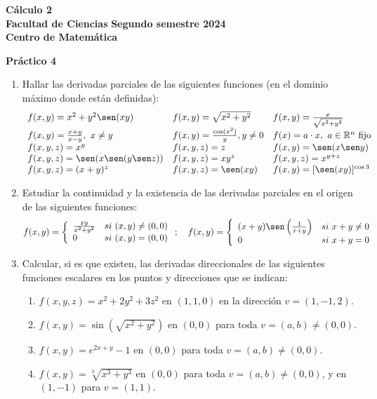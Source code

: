 \documentclass[11pt]{article}
\newcommand{\R}{\mathbb{R}}
\begin{document}
 \hfill {\bf C\'{a}lculo 2} \\
{\bf Facultad de Ciencias} \hfill {\bf Segundo semestre 2024} \\
{\bf Centro de Matem\'{a}tica} 

\vspace{1cm}

\begin{center}
{\bf Pr\'{a}ctico 4 }
\end{center}

\vspace{0,1cm}

\begin{enumerate}

 \item Hallar las derivadas parciales de las siguientes funciones (en el dominio m\'aximo donde est\'an definidas):
   \[\begin{array}{llll}
    f(x,y)=x^2+y^2\sen(xy)&f(x,y)=\sqrt{x^2+y^2}
                                   &f(x,y)=\frac{x}{\sqrt{x^2+y^2}}\\   
    f(x,y)=\frac{x+y}{x-y},\ x\neq y&f(x,y)=\frac{\cos(x^2)}{y},
                           y\neq 0&f(x)=a\cdot x,\ a\in\R^n\textrm{
                             fijo} \\ 
    f(x,y,z)=x^y    &f(x,y,z)=z   &f(x,y)=\sen(x\sen y)\\ 
    f(x,y,z)=\sen(x\sen(y\sen z))&f(x,y,z)=x{y^z}&f(x,y,z)=x^{y+z}\\
    f(x,y,z)=(x+y)^z    &f(x,y,z)=\sen(xy)&f(x,y)=[\sen(xy)]^{\cos
      3}\\ 
    \end{array}\]
    
\item Estudiar la continuidad y la existencia de las derivadas
  parciales en el origen de las siguientes funciones:
\[ f(x,y)= \left\{ \begin{array}{ll}
 \frac{xy}{x^2+y^2} & si\ (x,y)\neq (0,0)\\ 
 0 & si\ (x,y)=(0,0) \end{array} \right.;\quad
 f(x,y)= \left\{ \begin{array}{ll}
 (x+y)\sen\left(\frac{1}{x+y}\right) & si\ x+y\neq 0\\ 
 0 & si\ x+y=0 \end{array} \right. \]
 
\item Calcular, si es que existen, las derivadas direccionales de las siguientes funciones
  escalares en los puntos y direcciones que se indican:\begin{enumerate}
 \item $f(x,y,z)=x^2+2y^2+3z^2$ en $(1,1,0)$ en la direcci\'on $v=(1,-1,2)$.
 \item $f(x,y)=\sin \left( \sqrt{x^{2}+y^{2}}\right) $ en $(0,0)$ para toda $v=(a,b)\neq(0,0)$.
 \item  $f(x,y)=e^{2x+y}-1$ en $(0,0)$ para toda $v=(a,b)\neq(0,0)$.
\item $f(x,y)=\sqrt[3]{x^{3}+y^{3}}$ en $(0,0)$ para toda $v=(a,b)\neq(0,0)$, y en $(1,-1)$ para $v=(1,1)$. 


\end{enumerate}
\end{enumerate}
\end{document}
